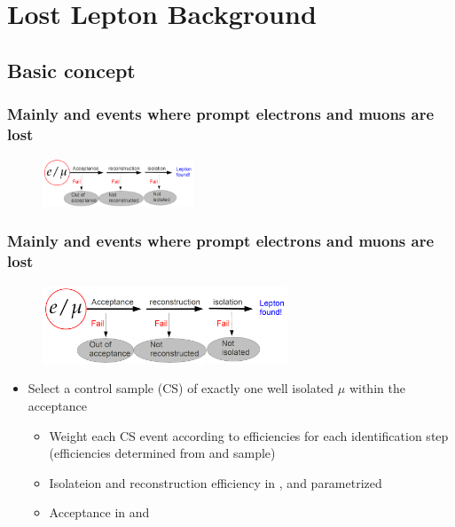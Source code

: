 \documentclass{beamer}
\begin{document}
\section{Lost Lepton Background }
\subsection{Basic concept}
\begin{frame}
\frametitle{Mainly \ttbar and \wpj events where prompt electrons and muons are lost}
 \begin{figure}
 \centering
  \includegraphics[width = 0.4\textwidth]{figures/lepton_veto_sketch.png}
 \end{figure}
\end{frame}

\begin{frame}
  \frametitle{Mainly \ttbar and \wpj events where prompt electrons and muons are lost}
   \begin{figure}
 \centering
  \includegraphics[width = 0.65\textwidth]{figures/lepton_veto_sketch.png}
 \end{figure}
      \begin{itemize}
      \item Select a control sample (CS) of exactly one well isolated $\mu$ within the acceptance
        \begin{itemize}
        \item Weight each CS event according to efficiencies for each identification step \\ (efficiencies determined from \ttbar and \wpj sample)
        \item Isolateion and reconstruction efficiency in \HT, \MHT and \NJets parametrized
        \item Acceptance in \MHT and \NJets
        \end{itemize}
      \end{itemize}
\end{frame}
\end{document}
